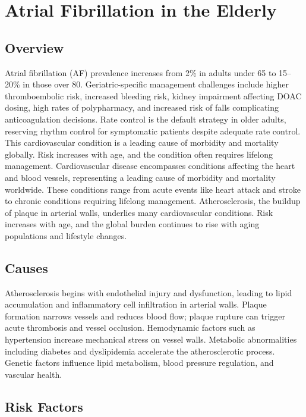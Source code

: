 \chapter{Atrial Fibrillation in the Elderly}
\label{sec:Atrial Fibrillation in the Elderly}

\section{Overview}
Atrial fibrillation (AF) prevalence increases from 2\% in adults under 65 to 15--20\% in those over 80. Geriatric-specific management challenges include higher thromboembolic risk, increased bleeding risk, kidney impairment affecting DOAC dosing, high rates of polypharmacy, and increased risk of falls complicating anticoagulation decisions. Rate control is the default strategy in older adults, reserving rhythm control for symptomatic patients despite adequate rate control. This cardiovascular condition is a leading cause of morbidity and mortality globally. Risk increases with age, and the condition often requires lifelong management. Cardiovascular disease encompasses conditions affecting the heart and blood vessels, representing a leading cause of morbidity and mortality worldwide. These conditions range from acute events like heart attack and stroke to chronic conditions requiring lifelong management. Atherosclerosis, the buildup of plaque in arterial walls, underlies many cardiovascular conditions. Risk increases with age, and the global burden continues to rise with aging populations and lifestyle changes.
\section{Causes}
Atherosclerosis begins with endothelial injury and dysfunction, leading to lipid accumulation and inflammatory cell infiltration in arterial walls. Plaque formation narrows vessels and reduces blood flow; plaque rupture can trigger acute thrombosis and vessel occlusion. Hemodynamic factors such as hypertension increase mechanical stress on vessel walls. Metabolic abnormalities including diabetes and dyslipidemia accelerate the atherosclerotic process. Genetic factors influence lipid metabolism, blood pressure regulation, and vascular health.
\section{Risk Factors}

